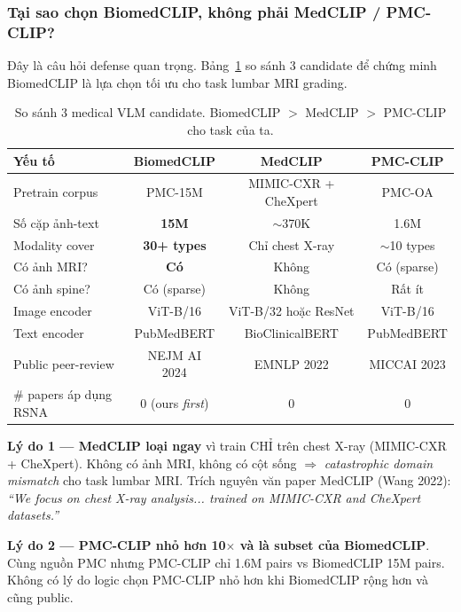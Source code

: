 \documentclass[11pt,a4paper]{article}
\newcommand{\bad}[1]{\textcolor{bad}{#1}}
\newcommand{\best}[1]{\textcolor{best}{\textbf{#1}}}
\begin{document}
\subsubsection*{Tại sao chọn BiomedCLIP, không phải MedCLIP / PMC-CLIP?}

\noindent Đây là câu hỏi defense quan trọng. Bảng~\ref{tab:vlm_compare}
so sánh 3 candidate để chứng minh BiomedCLIP là lựa chọn tối ưu cho
task lumbar MRI grading.

\begin{table}[h]
\centering
\caption{So sánh 3 medical VLM candidate. BiomedCLIP $>$ MedCLIP $>$
PMC-CLIP cho task của ta.}
\label{tab:vlm_compare}
\small
\begin{tabular}{@{}lccc@{}}
\toprule
\rowcolor{tablehdr}
Yếu tố & \best{BiomedCLIP} & MedCLIP & PMC-CLIP \\
\midrule
Pretrain corpus       & PMC-15M & MIMIC-CXR + CheXpert & PMC-OA \\
Số cặp ảnh-text       & \best{15M} & $\sim$370K & 1.6M \\
Modality cover        & \best{30+ types}  & \bad{Chỉ chest X-ray} & $\sim$10 types \\
Có ảnh MRI?           & \best{Có} & \bad{Không} & Có (sparse) \\
Có ảnh spine?         & Có (sparse) & \bad{Không} & Rất ít \\
Image encoder         & ViT-B/16 & ViT-B/32 hoặc ResNet & ViT-B/16 \\
Text encoder          & PubMedBERT & BioClinicalBERT & PubMedBERT \\
Public peer-review    & NEJM AI 2024 & EMNLP 2022 & MICCAI 2023 \\
\# papers áp dụng RSNA & 0 (ours \emph{first}) & 0 & 0 \\
\bottomrule
\end{tabular}
\end{table}

\noindent\textbf{Lý do 1 --- MedCLIP loại ngay} vì train CHỈ trên chest
X-ray (MIMIC-CXR + CheXpert). Không có ảnh MRI, không có cột sống
$\Rightarrow$ \emph{catastrophic domain mismatch} cho task lumbar MRI.
Trích nguyên văn paper MedCLIP (Wang 2022): \emph{``We focus on chest
X-ray analysis... trained on MIMIC-CXR and CheXpert datasets.''}

\noindent\textbf{Lý do 2 --- PMC-CLIP nhỏ hơn 10$\times$ và là subset
của BiomedCLIP}. Cùng nguồn PMC nhưng PMC-CLIP chỉ 1.6M pairs vs
BiomedCLIP 15M pairs. Không có lý do logic chọn PMC-CLIP nhỏ hơn khi
BiomedCLIP rộng hơn và cũng public.
\end{document}
